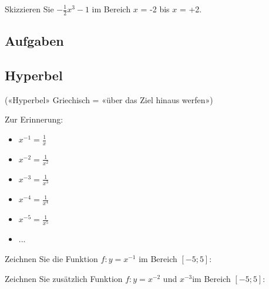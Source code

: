 Skizzieren Sie $-\frac{1}{2}x^3 - 1$ im Bereich $x$ = -2 bis $x$ = +2.

%



\subsection*{Aufgaben}

\newpage

\subsection{Hyperbel}
(«Hyperbel» Griechisch = «über das Ziel hinaus werfen»)


Zur Erinnerung:
\begin{multicols}{2}
\begin{itemize}
	\item $x^{-1} = \frac{1}{x}$
	\item $x^{-2} = \frac{1}{x^2}$
	\item $x^{-3} = \frac{1}{x^3}$
	\item $x^{-4} = \frac{1}{x^4}$
	\item $x^{-5} = \frac{1}{x^5}$
  \item ...
\end{itemize}
\end{multicols}

Zeichnen Sie die Funktion $f: y = x^{-1}$ im Bereich $[-5;5]$:


\newpage


Zeichnen Sie zusätzlich Funktion $f: y = x^{-2}$  und $x^{-3}$im Bereich $[-5;5]$:


